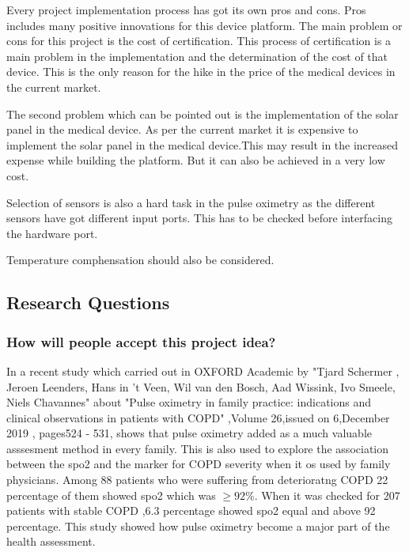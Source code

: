 Every project implementation process has got its own pros and cons. Pros includes many positive innovations for this device platform. The main problem or cons for this project is the cost of certification. This process of certification is a main problem in the implementation and the determination of the cost of that device. This is the only reason for the hike in the price of the medical devices in the current market.

The second problem which can be pointed out is the implementation of the solar panel in the medical device. As per the current market it  is expensive to implement the solar panel in the medical device.This may result in the increased expense while building the platform. But it can also be achieved in a very low cost.

Selection of sensors is also a hard task in the pulse oximetry as the different sensors have got different input ports. This has to be checked before interfacing the hardware port.

Temperature comphensation should also be considered. 


\subsection{Research Questions}



\subsubsection{How will people accept this project idea?}

In a recent study which carried out in OXFORD Academic by "Tjard Schermer , Jeroen Leenders,  Hans in ’t Veen,  Wil van den Bosch,  Aad Wissink, Ivo Smeele,  Niels Chavannes"  about "Pulse oximetry in family practice: indications and clinical observations in patients with COPD" ,Volume 26,issued on 6,December 2019 , pages524 - 531,   shows that  pulse oximetry added as a much valuable asssesment method in every family. This is also used to explore the association between the spo2 and the marker for COPD severity when it os used by family physicians.  Among 88 patients who were suffering from deterioratng COPD 22 percentage of them showed spo2 which was $\geq 92$\%.  When it was checked for 207 patients with stable COPD ,6.3 percentage showed spo2 equal and above 92 percentage. This study showed how pulse oximetry become a major part of the health assessment.  


